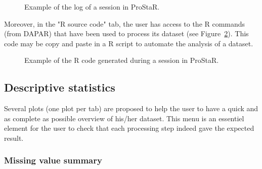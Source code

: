 \documentclass[12pt]{article}
\begin{document}
{\begin{figure}[b]
\centering
{}
\caption{Example of the log of a session in ProStaR.}\label{fig:sessionlog}
\end {figure}

Moreover, in the "R source code" tab, the user has access to the R commands 
(from DAPAR) that have been used to process its dataset 
(see Figure~\ref{fig:Rcode}). This code may be copy and paste in a R script to 
automate the analysis of a dataset.

\begin{figure}[b]
\centering
{}
\caption{Example of the R code generated during a 
session in ProStaR.}\label{fig:Rcode}
\end {figure}


\subsection{Descriptive statistics}\label{sec:descriptivestatistics}

Several plots (one plot per tab) are proposed to help the user to have a 
quick and as complete as possible overview of his/her dataset. This menu is 
an essentiel element for the user to check that each processing step indeed 
gave the expected result.


\subsubsection{Missing value summary}


}
\end{document}

